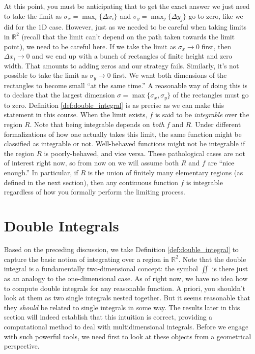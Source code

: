 At this point, you must be anticipating that to get the exact answer we just need to take the limit as $\sigma_x = \max_i \{\Delta x_i\}$ and $\sigma_y = \max_j \{\Delta y_j\}$ go to zero, like we did for the $1\text{D}$ case. However, just as we needed to be careful when taking limits in $\mathbb{R}^2$ (recall that the limit can't depend on the path taken towards the limit point), we need to be careful here. If we take the limit as $\sigma_x \rightarrow 0$ first, then $\Delta x_i \rightarrow 0$ and we end up with a bunch of rectangles of finite height and zero width. That amounts to adding zeros and our strategy fails. Similarly, it's not possible to take the limit as $\sigma_y \rightarrow 0$ first. We want both dimensions of the rectangles to become small ``at the same time.'' A reasonable way of doing this is to declare that the largest dimension $\sigma = \max \{\sigma_x, \sigma_y \}$ of the rectangles must go to zero. Definition \ref{def:double_integral} is as precise as we can make this statement in this course. When the limit exists, $f$ is said to be \textit{integrable} over the region $R$. Note that being integrable depends on \textit{both} $f$ and $R$. Under different formalizations of how one actually takes this limit, the same function might be classified as integrable or not. Well-behaved functions might not be integrable if the region $R$ is poorly-behaved, and vice versa. These pathological cases are not of interest right now, so from now on we will assume both $R$ and $f$ are ``nice enough.'' In particular, if $R$ is the union of finitely many \hyperref[def:elementary_regions]{elementary regions} (as defined in the next section), then any continuous function $f$ is integrable regardless of how you formally perform the limiting process.


\section{Double Integrals}

Based on the preceding discussion, we take Definition \ref{def:double_integral} to capture the basic notion of integrating over a region in $\mathbb{R}^2$. Note that the double integral is a fundamentally two-dimensional concept: the symbol $\iint$ is there just as an analogy to the one-dimensional case. As of right now, we have no idea how to compute double integrals for any reasonable function. A priori, you shouldn't look at them as two single integrals nested together. But it seems reasonable that they \textit{should} be related to single integrals in some way. The results later in this section will indeed establish that this intuition is correct, providing a computational method to deal with multidimensional integrals. Before we engage with such powerful tools, we need first to look at these objects from a geometrical perspective.

